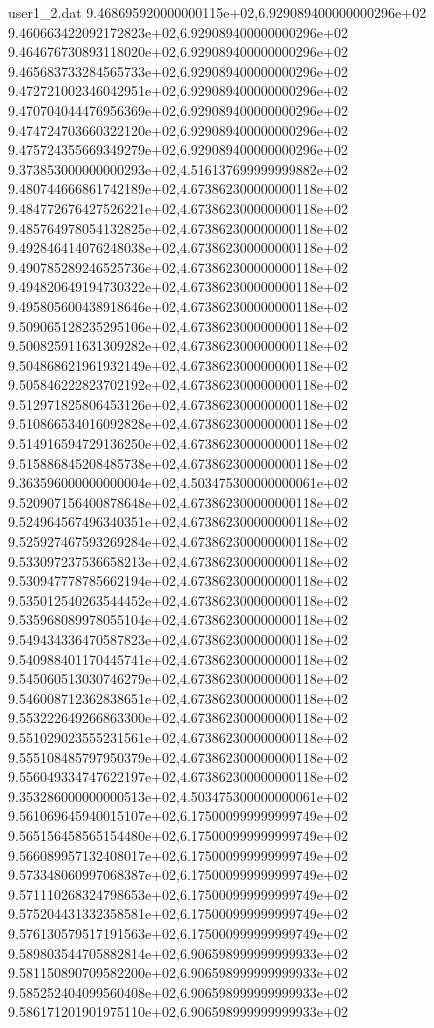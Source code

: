 \begin{filecontents}{user1_2.dat}
9.468695920000000115e+02,6.929089400000000296e+02
9.460663422092172823e+02,6.929089400000000296e+02
9.464676730893118020e+02,6.929089400000000296e+02
9.465683733284565733e+02,6.929089400000000296e+02
9.472721002346042951e+02,6.929089400000000296e+02
9.470704044476956369e+02,6.929089400000000296e+02
9.474724703660322120e+02,6.929089400000000296e+02
9.475724355669349279e+02,6.929089400000000296e+02
9.373853000000000293e+02,4.516137699999999882e+02
9.480744666861742189e+02,4.673862300000000118e+02
9.484772676427526221e+02,4.673862300000000118e+02
9.485764978054132825e+02,4.673862300000000118e+02
9.492846414076248038e+02,4.673862300000000118e+02
9.490785289246525736e+02,4.673862300000000118e+02
9.494820649194730322e+02,4.673862300000000118e+02
9.495805600438918646e+02,4.673862300000000118e+02
9.509065128235295106e+02,4.673862300000000118e+02
9.500825911631309282e+02,4.673862300000000118e+02
9.504868621961932149e+02,4.673862300000000118e+02
9.505846222823702192e+02,4.673862300000000118e+02
9.512971825806453126e+02,4.673862300000000118e+02
9.510866534016092828e+02,4.673862300000000118e+02
9.514916594729136250e+02,4.673862300000000118e+02
9.515886845208485738e+02,4.673862300000000118e+02
9.363596000000000004e+02,4.503475300000000061e+02
9.520907156400878648e+02,4.673862300000000118e+02
9.524964567496340351e+02,4.673862300000000118e+02
9.525927467593269284e+02,4.673862300000000118e+02
9.533097237536658213e+02,4.673862300000000118e+02
9.530947778785662194e+02,4.673862300000000118e+02
9.535012540263544452e+02,4.673862300000000118e+02
9.535968089978055104e+02,4.673862300000000118e+02
9.549434336470587823e+02,4.673862300000000118e+02
9.540988401170445741e+02,4.673862300000000118e+02
9.545060513030746279e+02,4.673862300000000118e+02
9.546008712362838651e+02,4.673862300000000118e+02
9.553222649266863300e+02,4.673862300000000118e+02
9.551029023555231561e+02,4.673862300000000118e+02
9.555108485797950379e+02,4.673862300000000118e+02
9.556049334747622197e+02,4.673862300000000118e+02
9.353286000000000513e+02,4.503475300000000061e+02
9.561069645940015107e+02,6.175000999999999749e+02
9.565156458565154480e+02,6.175000999999999749e+02
9.566089957132408017e+02,6.175000999999999749e+02
9.573348060997068387e+02,6.175000999999999749e+02
9.571110268324798653e+02,6.175000999999999749e+02
9.575204431332358581e+02,6.175000999999999749e+02
9.576130579517191563e+02,6.175000999999999749e+02
9.589803544705882814e+02,6.906598999999999933e+02
9.581150890709582200e+02,6.906598999999999933e+02
9.585252404099560408e+02,6.906598999999999933e+02
9.586171201901975110e+02,6.906598999999999933e+02

\end{filecontents}
